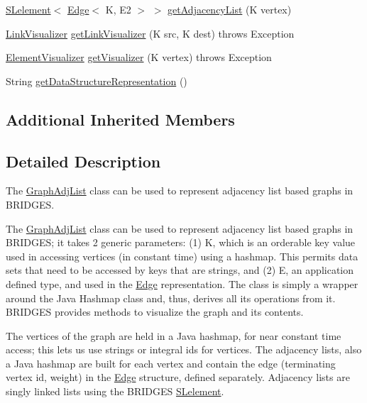 \begin{DoxyCompactItemize}
\hyperlink{classbridges_1_1base_1_1_s_lelement}{S\+Lelement}$<$ \hyperlink{classbridges_1_1base_1_1_edge}{Edge}$<$ K, E2 $>$ $>$ \hyperlink{classbridges_1_1base_1_1_graph_adj_list_aa8d25bc56b9a172999f0c62ee7e04b6f}{get\+Adjacency\+List} (K vertex)
\item 
\hyperlink{classbridges_1_1base_1_1_link_visualizer}{Link\+Visualizer} \hyperlink{classbridges_1_1base_1_1_graph_adj_list_af93888dbd2a768a2401619ad5dc95560}{get\+Link\+Visualizer} (K src, K dest)  throws Exception 
\item 
\hyperlink{classbridges_1_1base_1_1_element_visualizer}{Element\+Visualizer} \hyperlink{classbridges_1_1base_1_1_graph_adj_list_aafb45833cd5c13b6ce9bdece3fefde6a}{get\+Visualizer} (K vertex)  throws Exception 
\item 
String \hyperlink{classbridges_1_1base_1_1_graph_adj_list_a9bba66056cdf24197c41fff455e19a6c}{get\+Data\+Structure\+Representation} ()
\end{DoxyCompactItemize}
\subsection*{Additional Inherited Members}


\subsection{Detailed Description}
The \hyperlink{classbridges_1_1base_1_1_graph_adj_list}{Graph\+Adj\+List} class can be used to represent adjacency list based graphs in B\+R\+I\+D\+G\+E\+S. 

The \hyperlink{classbridges_1_1base_1_1_graph_adj_list}{Graph\+Adj\+List} class can be used to represent adjacency list based graphs in B\+R\+I\+D\+G\+E\+S; it takes 2 generic parameters\+: (1) K, which is an orderable key value used in accessing vertices (in constant time) using a hashmap. This permits data sets that need to be accessed by keys that are strings, and (2) E, an application defined type, and used in the \hyperlink{classbridges_1_1base_1_1_edge}{Edge} representation. The class is simply a wrapper around the Java Hashmap class and, thus, derives all its operations from it. B\+R\+I\+D\+G\+E\+S provides methods to visualize the graph and its contents.

The vertices of the graph are held in a Java hashmap, for near constant time access; this lets us use strings or integral ids for vertices. The adjacency lists, also a Java hashmap are built for each vertex and contain the edge (terminating vertex id, weight) in the \hyperlink{classbridges_1_1base_1_1_edge}{Edge} structure, defined separately. Adjacency lists are singly linked lists using the B\+R\+I\+D\+G\+E\+S \hyperlink{classbridges_1_1base_1_1_s_lelement}{S\+Lelement}.

